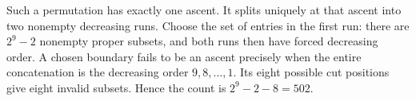 Such a permutation has exactly one ascent. It splits uniquely at that ascent into two nonempty decreasing runs. Choose the set of entries in the first run: there are $2^9-2$ nonempty proper subsets, and both runs then have forced decreasing order. A chosen boundary fails to be an ascent precisely when the entire concatenation is the decreasing order $9,8,\ldots,1$. Its eight possible cut positions give eight invalid subsets. Hence the count is $\boxed{2^9-2-8=502}$.
